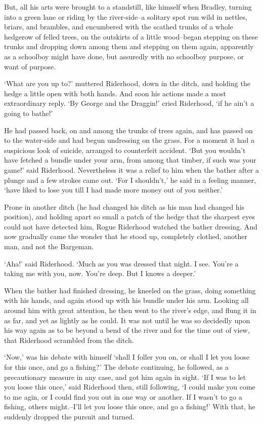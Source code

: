 But, all his arts were brought to a standstill, like himself when
Bradley, turning into a green lane or riding by the river-side--a
solitary spot run wild in nettles, briars, and brambles, and encumbered
with the scathed trunks of a whole hedgerow of felled trees, on the
outskirts of a little wood--began stepping on these trunks and dropping
down among them and stepping on them again, apparently as a schoolboy
might have done, but assuredly with no schoolboy purpose, or want of
purpose.

‘What are you up to?’ muttered Riderhood, down in the ditch, and holding
the hedge a little open with both hands. And soon his actions made a
most extraordinary reply. ‘By George and the Draggin!’ cried Riderhood,
‘if he ain’t a going to bathe!’

He had passed back, on and among the trunks of trees again, and has
passed on to the water-side and had begun undressing on the grass. For
a moment it had a suspicious look of suicide, arranged to counterfeit
accident. ‘But you wouldn’t have fetched a bundle under your arm, from
among that timber, if such was your game!’ said Riderhood. Nevertheless
it was a relief to him when the bather after a plunge and a few strokes
came out. ‘For I shouldn’t,’ he said in a feeling manner, ‘have liked to
lose you till I had made more money out of you neither.’

Prone in another ditch (he had changed his ditch as his man had changed
his position), and holding apart so small a patch of the hedge that the
sharpest eyes could not have detected him, Rogue Riderhood watched the
bather dressing. And now gradually came the wonder that he stood up,
completely clothed, another man, and not the Bargeman.

‘Aha!’ said Riderhood. ‘Much as you was dressed that night. I see.
You’re a taking me with you, now. You’re deep. But I knows a deeper.’

When the bather had finished dressing, he kneeled on the grass, doing
something with his hands, and again stood up with his bundle under his
arm. Looking all around him with great attention, he then went to the
river’s edge, and flung it in as far, and yet as lightly as he could. It
was not until he was so decidedly upon his way again as to be beyond a
bend of the river and for the time out of view, that Riderhood scrambled
from the ditch.

‘Now,’ was his debate with himself ‘shall I foller you on, or shall I
let you loose for this once, and go a fishing?’ The debate continuing,
he followed, as a precautionary measure in any case, and got him again
in sight. ‘If I was to let you loose this once,’ said Riderhood then,
still following, ‘I could make you come to me agin, or I could find
you out in one way or another. If I wasn’t to go a fishing, others
might.--I’ll let you loose this once, and go a fishing!’ With that, he
suddenly dropped the pursuit and turned.


